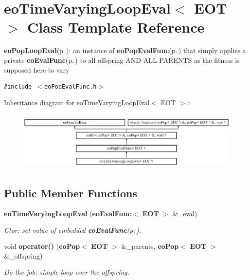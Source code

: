 \section{eo\-Time\-Varying\-Loop\-Eval$<$ EOT $>$ Class Template Reference}
\label{classeo_time_varying_loop_eval}
{\bf eo\-Pop\-Loop\-Eval}{\rm (p.\,\pageref{classeo_pop_loop_eval})}: an instance of {\bf eo\-Pop\-Eval\-Func}{\rm (p.\,\pageref{classeo_pop_eval_func})} that simply applies a private {\bf eo\-Eval\-Func}{\rm (p.\,\pageref{classeo_eval_func})} to all offspring AND ALL PARENTS as the fitness is supposed here to vary  


{\tt \#include $<$eo\-Pop\-Eval\-Func.h$>$}

Inheritance diagram for eo\-Time\-Varying\-Loop\-Eval$<$ EOT $>$::\begin{figure}[H]
\begin{center}
\leavevmode
\includegraphics[height=3.01075cm]{classeo_time_varying_loop_eval}
\end{center}
\end{figure}
\subsection*{Public Member Functions}
\begin{CompactItemize}
\item 
{\bf eo\-Time\-Varying\-Loop\-Eval} ({\bf eo\-Eval\-Func}$<$ {\bf EOT} $>$ \&\_\-eval)\label{classeo_time_varying_loop_eval_a0}

\begin{CompactList}\small\item\em Ctor: set value of embedded {\bf eo\-Eval\-Func}{\rm (p.\,\pageref{classeo_eval_func})}. \item\end{CompactList}\item 
void {\bf operator()} ({\bf eo\-Pop}$<$ {\bf EOT} $>$ \&\_\-parents, {\bf eo\-Pop}$<$ {\bf EOT} $>$ \&\_\-offspring)\label{classeo_time_varying_loop_eval_a1}

\begin{CompactList}\small\item\em Do the job: simple loop over the offspring. \item\end{CompactList}\end{CompactItemize}

